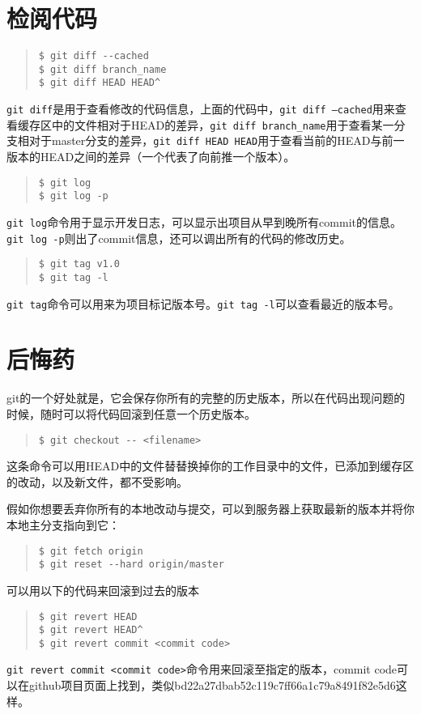 \documentclass{article}
\begin{document}
	\section{检阅代码} %
	\label{sec:检阅代码}
		\begin{quote}
			\begin{lstlisting}
$ git diff --cached
$ git diff branch_name
$ git diff HEAD HEAD^
			\end{lstlisting}
		\end{quote}
		\par{\tt git diff}是用于查看修改的代码信息，上面的代码中，{\tt git diff --cached}用来查看缓存区中的文件相对于HEAD的差异，{\tt git diff branch\_name}用于查看某一分支相对于master分支的差异，{\tt git diff HEAD HEAD$\hat{}$}用于查看当前的HEAD与前一版本的HEAD之间的差异（一个$\hat{}$代表了向前推一个版本）。
		\begin{quote}
			\begin{lstlisting}
$ git log
$ git log -p
			\end{lstlisting}
		\end{quote}
		\par{\tt git log}命令用于显示开发日志，可以显示出项目从早到晚所有commit的信息。{\tt git log -p}则出了commit信息，还可以调出所有的代码的修改历史。
		\begin{quote}
			\begin{lstlisting}
$ git tag v1.0
$ git tag -l
			\end{lstlisting}
		\end{quote}
		{\tt git tag}命令可以用来为项目标记版本号。{\tt git tag -l}可以查看最近的版本号。
	\section{后悔药} %
	\label{sec:后悔药}
		git的一个好处就是，它会保存你所有的完整的历史版本，所以在代码出现问题的时候，随时可以将代码回滚到任意一个历史版本。
		\begin{quote}
			\begin{lstlisting}
$ git checkout -- <filename>
			\end{lstlisting}
		\end{quote}
		这条命令可以用HEAD中的文件替替换掉你的工作目录中的文件，已添加到缓存区的改动，以及新文件，都不受影响。
		\par 假如你想要丢弃你所有的本地改动与提交，可以到服务器上获取最新的版本并将你本地主分支指向到它：
		\begin{quote}
			\begin{lstlisting}
$ git fetch origin
$ git reset --hard origin/master
			\end{lstlisting}
		\end{quote}
		可以用以下的代码来回滚到过去的版本
		\begin{quote}
			\begin{lstlisting}
$ git revert HEAD
$ git revert HEAD^
$ git revert commit <commit code>
			\end{lstlisting}
		\end{quote}
		{\tt git revert commit <commit code>}命令用来回滚至指定的版本，commit code可以在github项目页面上找到，类似bd22a27dbab52c119c7ff66a1c79a8491f82e5d6这样。
\end{document}
